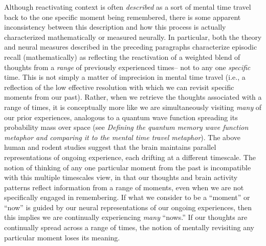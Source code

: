 \documentclass{article}
\begin{document}
Although reactivating context is often \textit{described} as a sort of mental time travel back to the one specific moment being remembered, there is some apparent inconsistency between this description and how this process is actually characterized mathematically or measured neurally.  In particular, both the theory and neural measures described in the preceding paragraphs characterize episodic recall (mathematically) as reflecting the reactivation of a weighted blend of thoughts from a \textit{range} of previously experienced times-- not to any one \textit{specific} time.  This is not simply a matter of imprecision in mental time travel (i.e., a reflection of the low effective resolution with which we can revisit specific moments from our past).  Rather, when we retrieve the thoughts associated with a range of times, it is conceptually more like we are simultaneously visiting \textit{many} of our prior experiences, analogous to a quantum wave function spreading its probability mass over space (see \textit{Defining the {\normalfont quantum memory wave function} metaphor and comparing it to the {\normalfont mental time travel} metaphor}). The above human and rodent studies suggest that the brain maintains parallel representations of ongoing experience, each drifting at a different timescale.  The notion of thinking of any one particular moment from the past is incompatible with this multiple timescales view, in that our thoughts and brain activity patterns reflect information from a range of moments, even when we are not specifically engaged in remembering.  If what we consider to be a ``moment'' or ``now'' is guided by our neural representations of our ongoing experiences, then this implies we are continually experiencing \textit{many} ``nows.''  If our thoughts are continually spread across a range of times, the notion of mentally revisiting any particular moment loses its meaning.
\end{document}
